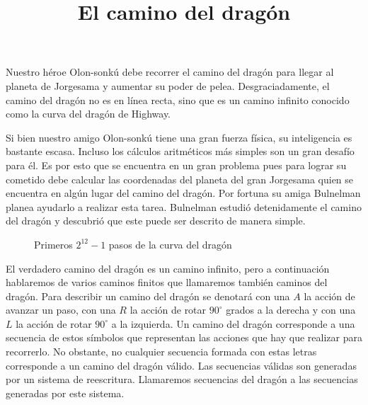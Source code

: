 \documentclass{oci}
\title{El camino del drag\'on}
\begin{document}
\maketitle
Nuestro héroe Olon-sonkú debe recorrer el camino del dragón para llegar al planeta de Jorgesama y aumentar su poder de pelea. Desgraciadamente, el camino del dragón no es en línea recta, sino que es un camino infinito conocido como la curva del dragón de Highway.



Si bien nuestro amigo Olon-sonkú tiene una gran fuerza física, su inteligencia es bastante escasa.
Incluso los cálculos aritméticos más simples son un gran desafío para él.
Es por esto que se encuentra en un gran problema pues para lograr su cometido debe calcular las coordenadas del planeta del gran Jorgesama quien se encuentra en algún lugar del camino del dragón.
Por fortuna su amiga Bulnelman planea ayudarlo a realizar esta tarea.
Bulnelman estudió detenidamente el camino del dragón y descubrió que este puede ser descrito de manera simple.

\begin{wrapfigure}{r}{0.5\textwidth}
  \centering
			
		\caption{Primeros $2^{12}-1$ pasos de la curva del dragón}
\end{wrapfigure}

El verdadero camino del dragón es un camino infinito, pero a continuación hablaremos de varios caminos finitos que llamaremos también caminos del dragón.
Para describir un camino del dragón se denotará con una $A$ la acción de avanzar un paso, con una $R$ la acción de rotar $90^{\circ}$ grados a la derecha y con una $L$ la acción de rotar $90^{\circ}$ a la izquierda.
Un camino del dragón corresponde a una secuencia de estos símbolos que representan las acciones que hay que realizar para recorrerlo.
No obstante, no cualquier secuencia formada con estas letras corresponde a un camino del dragón válido.
Las secuencias válidas son generadas por un sistema de reescritura.
Llamaremos secuencias del dragón a las secuencias generadas por este sistema.
\end{document}
